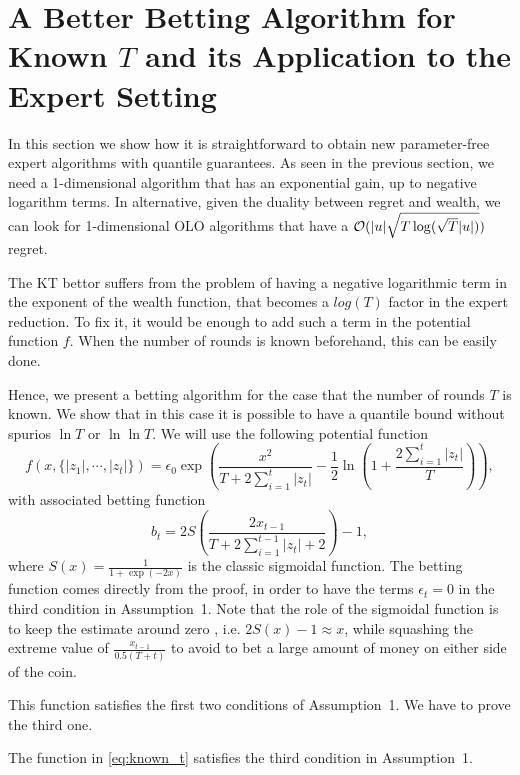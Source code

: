 \section{A Better Betting Algorithm for Known $T$ and its Application to the Expert Setting}

In this section we show how it is straightforward to obtain new parameter-free expert algorithms with quantile guarantees.
As seen in the previous section, we need a 1-dimensional algorithm that has an exponential gain, up to negative logarithm terms. In alternative, given the duality between regret and wealth, we can look for 1-dimensional \ac{OLO} algorithms that have a $\mathcal{O}(|u|\sqrt{T \log(\sqrt{T} |u|)})$ regret.

The \ac{KT} bettor suffers from the problem of having a negative logarithmic term in the exponent of the wealth function, that becomes a $log(T)$ factor in the expert reduction.
To fix it, it would be enough to add such a term in the potential function $f$. When the number of rounds is known beforehand, this can be easily done.

Hence, we present a betting algorithm for the case that the number of rounds $T$ is known. We show that in this case it is possible to have a quantile bound without spurios $\ln T$ or $\ln \ln T$.
We will use the following potential function
\begin{equation}
\label{eq:known_t}
f(x,\{|z_1|,\cdots, |z_t|\})=\epsilon_0 \exp\left(\frac{x^2}{T + 2 \sum_{i=1}^{t} |z_t|}-\frac{1}{2}\ln\left(1+\frac{2 \sum_{i=1}^{t} |z_t|}{T}\right)\right),
\end{equation}
with associated betting function
\[
b_t=2 S\left(\frac{2 x_{t-1}}{T+2 \sum_{i=1}^{t-1} |z_t|+2}\right)-1,
\]
where $S(x)=\frac{1}{1+\exp(-2 x)}$ is the classic sigmoidal function.
The betting function comes directly from the proof, in order to have the terms $\epsilon_t=0$ in the third condition in Assumption~1.
Note that the role of the sigmoidal function is to keep the estimate around zero , i.e. $2 S(x)-1\approx x$, while squashing the extreme value of $\frac{x_{t-1}}{0.5 (T+t)}$ to avoid to bet a large amount of money on either side of the coin.

This function satisfies the first two conditions of Assumption~1.
We have to prove the third one.

\begin{theorem}
\label{theo:known_t}
The function in \eqref{eq:known_t} satisfies the third condition in Assumption~1.
\end{theorem}


